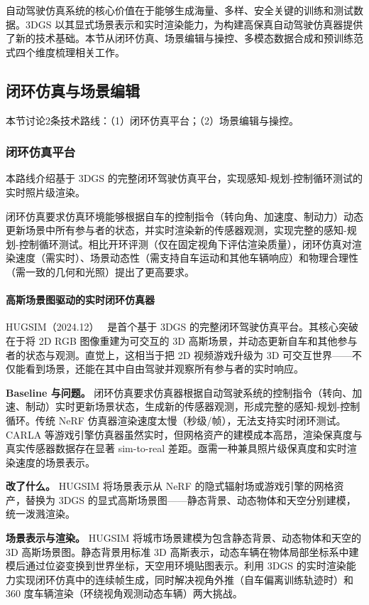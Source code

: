 自动驾驶仿真系统的核心价值在于能够生成海量、多样、安全关键的训练和测试数据。3DGS 以其显式场景表示和实时渲染能力，为构建高保真自动驾驶仿真器提供了新的技术基础。本节从闭环仿真、场景编辑与操控、多模态数据合成和预训练范式四个维度梳理相关工作。

\subsection{闭环仿真与场景编辑}
\label{ss:18_2}

本节讨论2条技术路线：（1）闭环仿真平台；（2）场景编辑与操控。

\subsubsection{闭环仿真平台}

本路线介绍基于 3DGS 的完整闭环驾驶仿真平台，实现感知-规划-控制循环测试的实时照片级渲染。

闭环仿真要求仿真环境能够根据自车的控制指令（转向角、加速度、制动力）动态更新场景中所有参与者的状态，并实时渲染新的传感器观测，实现完整的感知-规划-控制循环测试。相比开环评测（仅在固定视角下评估渲染质量），闭环仿真对渲染速度（需实时）、场景动态性（需支持自车运动和其他车辆响应）和物理合理性（需一致的几何和光照）提出了更高要求。

\paragraph{高斯场景图驱动的实时闭环仿真器}

HUGSIM（2024.12）~\cite{2412_01718} 是首个基于 3DGS 的完整闭环驾驶仿真平台。其核心突破在于将 2D RGB 图像重建为可交互的 3D 高斯场景，并动态更新自车和其他参与者的状态与观测。直觉上，这相当于把 2D 视频游戏升级为 3D 可交互世界——不仅能看到场景，还能在其中自由驾驶并观察所有参与者的实时响应。

\textbf{Baseline 与问题。} 闭环仿真要求仿真器根据自动驾驶系统的控制指令（转向、加速、制动）实时更新场景状态，生成新的传感器观测，形成完整的感知-规划-控制循环。传统 NeRF 仿真器渲染速度太慢（秒级/帧），无法支持实时闭环测试。CARLA 等游戏引擎仿真器虽然实时，但网格资产的建模成本高昂，渲染保真度与真实传感器数据存在显著 sim-to-real 差距。亟需一种兼具照片级保真度和实时渲染速度的场景表示。

\textbf{改了什么。} HUGSIM 将场景表示从 NeRF 的隐式辐射场或游戏引擎的网格资产，替换为 3DGS 的显式高斯场景图——静态背景、动态物体和天空分别建模，统一泼溅渲染。

\textbf{场景表示与渲染。} HUGSIM 将城市场景建模为包含静态背景、动态物体和天空的 3D 高斯场景图。静态背景用标准 3D 高斯表示，动态车辆在物体局部坐标系中建模后通过位姿变换到世界坐标，天空用环境贴图表示。利用 3DGS 的实时渲染能力实现闭环仿真中的连续帧生成，同时解决视角外推（自车偏离训练轨迹时）和 360 度车辆渲染（环绕视角观测动态车辆）两大挑战。

